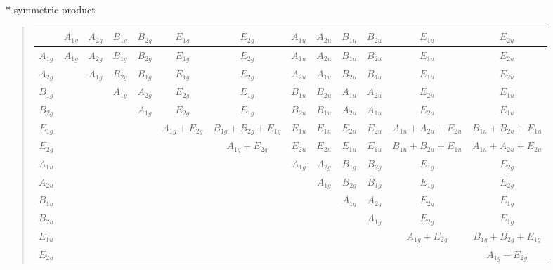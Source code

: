\documentclass[fleqn,10pt,landscape]{jsarticle}
\begin{document}
* symmetric product
\begin{quote}
\begin{tabular}{c|cccccccccccc} \hline \hline
 & $ A_{1g} $ & $ A_{2g} $ & $ B_{1g} $ & $ B_{2g} $ & $ E_{1g} $ & $ E_{2g} $ & $ A_{1u} $ & $ A_{2u} $ & $ B_{1u} $ & $ B_{2u} $ & $ E_{1u} $ & $ E_{2u} $ \\ \hline
$ A_{1g} $ & $ A_{1g} $ & $ A_{2g} $ & $ B_{1g} $ & $ B_{2g} $ & $ E_{1g} $ & $ E_{2g} $ & $ A_{1u} $ & $ A_{2u} $ & $ B_{1u} $ & $ B_{2u} $ & $ E_{1u} $ & $ E_{2u} $ \\
$ A_{2g} $ & $  $ & $ A_{1g} $ & $ B_{2g} $ & $ B_{1g} $ & $ E_{1g} $ & $ E_{2g} $ & $ A_{2u} $ & $ A_{1u} $ & $ B_{2u} $ & $ B_{1u} $ & $ E_{1u} $ & $ E_{2u} $ \\
$ B_{1g} $ & $  $ & $  $ & $ A_{1g} $ & $ A_{2g} $ & $ E_{2g} $ & $ E_{1g} $ & $ B_{1u} $ & $ B_{2u} $ & $ A_{1u} $ & $ A_{2u} $ & $ E_{2u} $ & $ E_{1u} $ \\
$ B_{2g} $ & $  $ & $  $ & $  $ & $ A_{1g} $ & $ E_{2g} $ & $ E_{1g} $ & $ B_{2u} $ & $ B_{1u} $ & $ A_{2u} $ & $ A_{1u} $ & $ E_{2u} $ & $ E_{1u} $ \\
$ E_{1g} $ & $  $ & $  $ & $  $ & $  $ & $ A_{1g} + E_{2g} $ & $ B_{1g} + B_{2g} + E_{1g} $ & $ E_{1u} $ & $ E_{1u} $ & $ E_{2u} $ & $ E_{2u} $ & $ A_{1u} + A_{2u} + E_{2u} $ & $ B_{1u} + B_{2u} + E_{1u} $ \\
$ E_{2g} $ & $  $ & $  $ & $  $ & $  $ & $  $ & $ A_{1g} + E_{2g} $ & $ E_{2u} $ & $ E_{2u} $ & $ E_{1u} $ & $ E_{1u} $ & $ B_{1u} + B_{2u} + E_{1u} $ & $ A_{1u} + A_{2u} + E_{2u} $ \\
$ A_{1u} $ & $  $ & $  $ & $  $ & $  $ & $  $ & $  $ & $ A_{1g} $ & $ A_{2g} $ & $ B_{1g} $ & $ B_{2g} $ & $ E_{1g} $ & $ E_{2g} $ \\
$ A_{2u} $ & $  $ & $  $ & $  $ & $  $ & $  $ & $  $ & $  $ & $ A_{1g} $ & $ B_{2g} $ & $ B_{1g} $ & $ E_{1g} $ & $ E_{2g} $ \\
$ B_{1u} $ & $  $ & $  $ & $  $ & $  $ & $  $ & $  $ & $  $ & $  $ & $ A_{1g} $ & $ A_{2g} $ & $ E_{2g} $ & $ E_{1g} $ \\
$ B_{2u} $ & $  $ & $  $ & $  $ & $  $ & $  $ & $  $ & $  $ & $  $ & $  $ & $ A_{1g} $ & $ E_{2g} $ & $ E_{1g} $ \\
$ E_{1u} $ & $  $ & $  $ & $  $ & $  $ & $  $ & $  $ & $  $ & $  $ & $  $ & $  $ & $ A_{1g} + E_{2g} $ & $ B_{1g} + B_{2g} + E_{1g} $ \\
$ E_{2u} $ & $  $ & $  $ & $  $ & $  $ & $  $ & $  $ & $  $ & $  $ & $  $ & $  $ & $  $ & $ A_{1g} + E_{2g} $ \\
 \hline \hline
\end{tabular}
\end{quote}
\end{document}
